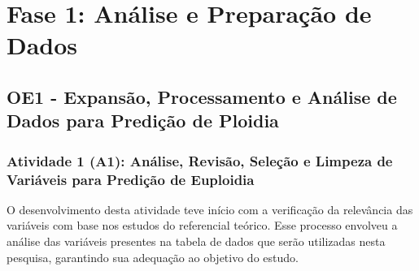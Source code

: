 \section{Fase 1: Análise e Preparação de Dados}
\subsection{OE1 - Expansão, Processamento e Análise de Dados para Predição de Ploidia}
\subsubsection{Atividade 1 (A1): Análise, Revisão, Seleção e Limpeza de Variáveis para Predição de Euploidia}
O desenvolvimento desta atividade teve início com a verificação da relevância das variáveis com base nos estudos do referencial teórico. Esse processo envolveu a análise das variáveis presentes na tabela de dados que serão utilizadas nesta pesquisa, garantindo sua adequação ao objetivo do estudo. 


